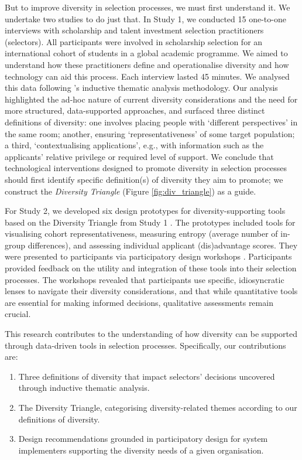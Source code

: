 But to improve diversity in selection processes, we must first understand it. We undertake two studies to do just that. In Study 1, we conducted 15 one-to-one interviews with scholarship and talent investment selection practitioners (selectors). All participants were involved in scholarship selection for an international cohort of students in a global academic programme. We aimed to understand how these practitioners define and operationalise diversity and how technology can aid this process. Each interview lasted 45 minutes. We analysed this data following \textcite{braun_using_2006}'s inductive thematic analysis methodology. Our analysis highlighted the ad-hoc nature of current diversity considerations and the need for more structured, data-supported approaches, and surfaced three distinct definitions of diversity: one involves placing people with `different perspectives' in the same room; another, ensuring `representativeness' of some target population; a third, `contextualising applications', e.g., with information such as the applicants' relative privilege or required level of support. We conclude that technological interventions designed to promote diversity in selection processes should first identify specific definition(s) of diversity they aim to promote; we construct the \emph{Diversity Triangle} (Figure \ref{fig:div_triangle}) as a guide.

For Study 2, we developed six design prototypes for diversity-supporting tools based on the Diversity Triangle from Study 1 \cite{Buchenau_Suri_2000}. The prototypes included tools for visualising cohort representativeness, measuring entropy (average number of in-group differences), and assessing individual applicant (dis)advantage scores. They were presented to participants via participatory design workshops \cite{Zimmerman_Forlizzi_2017}. Participants provided feedback on the utility and integration of these tools into their selection processes. The workshops revealed that participants use specific, idiosyncratic lenses to navigate their diversity considerations, and that while quantitative tools are essential for making informed decisions, qualitative assessments remain crucial.

This research contributes to the understanding of how diversity can be supported through data-driven tools in selection processes. Specifically, our contributions are:

\begin{enumerate}
    \item Three definitions of diversity that impact selectors' decisions uncovered through inductive thematic analysis.
    \item The Diversity Triangle, categorising diversity-related themes according to our definitions of diversity.
    \item Design recommendations grounded in participatory design for system implementers supporting the diversity needs of a given organisation.
\end{enumerate}

